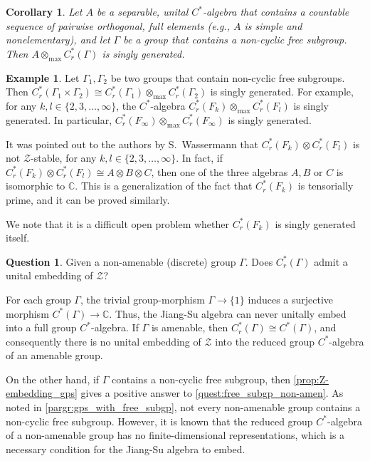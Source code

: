 \documentclass{amsart}
\newtheorem{cor}[corCt]{Corollary}
\theoremstyle{definition}
\newtheorem{quest}[questCt]{Question}
\newtheorem{exmpl}[exmplCt]{Example}
\begin{document}
\begin{cor}
\label{prop:Gen2_tensor_free_gp_alg}
    Let $A$ be a separable, unital {{$C^*$-al\-ge\-bra}}{} that contains a countable sequence of pairwise orthogonal, full elements (e.g., $A$ is simple and nonelementary), and let $\Gamma$ be a group that contains a non-cyclic free subgroup.
    Then $A\otimes_{\text{max}} C^*_r(\Gamma)$ is singly generated.
\end{cor}

\begin{exmpl}
\label{pargr:free_gp_tensor_free_gp}
    Let $\Gamma_1,\Gamma_2$ be two groups that contain non-cyclic free subgroups.
    Then $C^*_r(\Gamma_1\times \Gamma_2)\cong C^*_r(\Gamma_1)\otimes_{\text{max}} C^*_r(\Gamma_2)$ is singly generated.
    For example, for any $k,l\in\{2,3,\ldots,\infty\}$, the {{$C^*$-al\-ge\-bra}}{} $C^*_r(F_k)\otimes_{\text{max}} C^*_r(F_l)$ is singly generated.
    In particular, $C^*_r(F_\infty) \otimes_{\text{max}} C^*_r(F_\infty)$ is singly generated.

    It was pointed out to the authors by S.\ Wassermann that $C^*_r(F_k)\otimes C^*_r(F_l)$ is not $\mathcal{Z}$-stable, for any $k,l\in\{2,3,\ldots,\infty\}$.
    In fact, if $C^*_r(F_k)\otimes C^*_r(F_l)\cong A\otimes B\otimes C$, then one of the three algebras $A,B$ or $C$ is isomorphic to ${{\mathbb{C}}}$.
    This is a generalization of the fact that $C^*_r(F_k)$ is tensorially prime, and it can be proved similarly.

    We note that it is a difficult open problem whether $C^*_r(F_k)$ is singly generated itself.
\end{exmpl}

\begin{quest}
\label{quest:free_subgp_non-amen}
    Given a non-amenable (discrete) group $\Gamma$.
    Does $C^*_r(\Gamma)$ admit a unital embedding of $\mathcal{Z}$?
\end{quest}

\noindent
    For each group $\Gamma$, the trivial group-morphism $\Gamma\to\{1\}$ induces a surjective morphism $C^*(\Gamma)\to{{\mathbb{C}}}$.
    Thus, the Jiang-Su algebra can never unitally embed into a full group {{$C^*$-al\-ge\-bra}}{}.
    If $\Gamma$ is amenable, then $C^*_r(\Gamma)\cong C^*(\Gamma)$, and consequently there is no unital embedding of $\mathcal{Z}$ into the reduced group {{$C^*$-al\-ge\-bra}}{} of an amenable group.

    On the other hand, if $\Gamma$ contains a non-cyclic free subgroup, then \autoref{prop:Z-embedding_gps} gives a positive answer to \autoref{quest:free_subgp_non-amen}.
    As noted in \autoref{pargr:gps_with_free_subgp}, not every non-amenable group contains a non-cyclic free subgroup.
    However, it is known that the reduced group {{$C^*$-al\-ge\-bra}}{} of a non-amenable group has no finite-dimensional representations, which is a necessary condition for the Jiang-Su algebra to embed.
\end{document}
